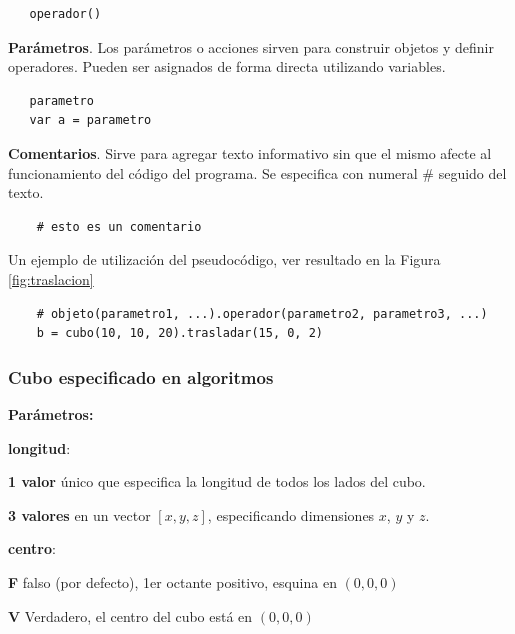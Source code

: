 \begin{verbatim}
   operador()
\end{verbatim}


\textbf{Parámetros}. Los parámetros o acciones sirven para construir objetos y definir operadores. Pueden ser asignados de forma directa utilizando variables.

\begin{verbatim}
   parametro
   var a = parametro
\end{verbatim}

\textbf{Comentarios}. Sirve para agregar texto informativo sin que el mismo afecte al funcionamiento del código del programa. Se especifica con numeral \# seguido del texto.
\begin{verbatim}
    # esto es un comentario
\end{verbatim}

\vspace{5mm}
Un ejemplo de utilización del pseudocódigo, ver resultado en la Figura \ref{fig:traslacion}

\begin{verbatim}
    # objeto(parametro1, ...).operador(parametro2, parametro3, ...)
    b = cubo(10, 10, 20).trasladar(15, 0, 2) 
\end{verbatim}


\clearpage
\subsubsection{Cubo especificado en algoritmos}
\begin{description}
\item  \textbf{Parámetros:}
\item   \textbf{longitud}:
\begin{description}
\item \textbf{1 valor} único que especifica la longitud de todos los lados del cubo.
\item \textbf{3 valores} en un vector $[x,y,z]$, especificando dimensiones $x$, $y$ y $z$.
\end{description}
\item   \textbf{centro}:
\begin{description}
\item \textbf{F} falso (por defecto), 1er octante positivo, esquina en $(0, 0, 0)$
\item \textbf{V} Verdadero, el centro del cubo está en $(0, 0, 0)$
\end{description}
\end{description}

